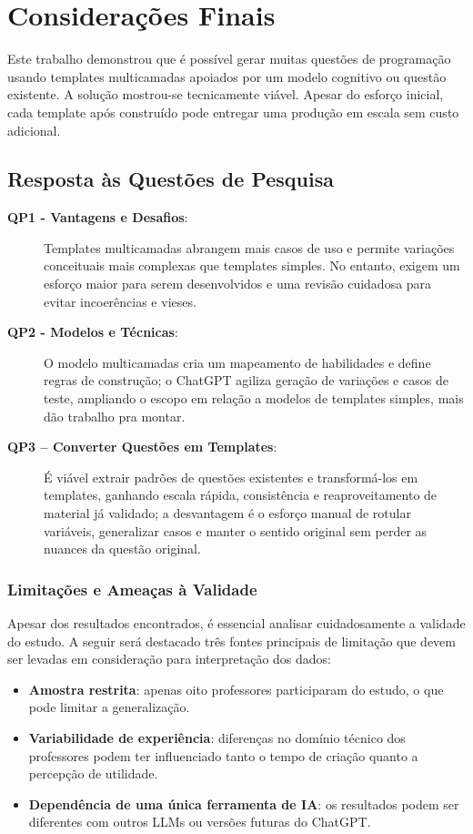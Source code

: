 \chapter{Considerações Finais}

Este trabalho demonstrou que é possível gerar muitas questões de programação usando templates multicamadas apoiados por um modelo cognitivo ou questão existente. A solução mostrou-se tecnicamente viável. Apesar do esforço inicial, cada template após construído pode entregar uma produção em escala sem custo adicional. 

\section{Resposta às Questões de Pesquisa }

\begin{description}
    \item[\textbf{QP1 - Vantagens e Desafios}:] Templates multicamadas abrangem mais casos de uso e permite variações conceituais mais complexas que templates simples. No entanto, exigem um esforço maior para serem desenvolvidos e uma revisão cuidadosa para evitar incoerências e vieses.
    \item[\textbf{QP2 - Modelos e Técnicas}:] O modelo multicamadas cria um mapeamento de habilidades e define regras de construção; o ChatGPT agiliza geração de variações e casos de teste, ampliando o escopo em relação a modelos de templates simples, mais dão trabalho pra montar.
    \item[\textbf{QP3 – Converter Questões em Templates}:] É viável extrair padrões de questões existentes e transformá-los em templates, ganhando escala rápida, consistência e reaproveitamento de material já validado; a desvantagem é o esforço manual de rotular variáveis, generalizar casos e manter o sentido original sem perder as nuances da questão original.    
\end{description}

\subsection{Limitações e Ameaças à Validade}
Apesar dos resultados encontrados, é essencial analisar cuidadosamente a validade do estudo. A seguir será destacado três fontes principais de limitação que devem ser levadas em consideração para interpretação dos dados:
\begin{itemize}
\item \textbf{Amostra restrita}: apenas oito professores participaram do estudo, o que pode limitar a generalização.
\item \textbf{Variabilidade de experiência}: diferenças no domínio técnico dos professores podem ter influenciado tanto o tempo de criação quanto a percepção de utilidade.
\item \textbf{Dependência de uma única ferramenta de IA}: os resultados podem ser diferentes com outros LLMs ou versões futuras do ChatGPT.
\end{itemize}


